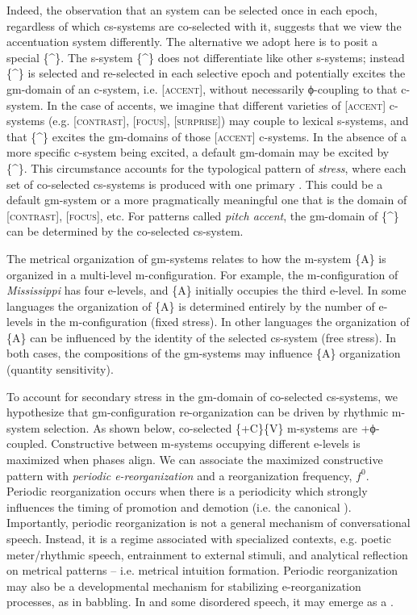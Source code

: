   Indeed, the observation that an  system can be selected once in each epoch, regardless of which cs-systems are co-selected with it, suggests that we view the accentuation system differently. The alternative we adopt here is to posit a special  \{\^{}\}. The s-system \{\^{}\} does not differentiate like other s-systems; instead \{\^{}\} is selected and re-selected in each selective epoch and potentially excites the gm-domain of an  c-system, i.e. [\textsc{accent}], without necessarily ϕ-coupling to that c-system. In the case of  accents, we imagine that different varieties of [\textsc{accent}] c-systems (e.g. [\textsc{contrast}], [\textsc{focus}], [\textsc{surprise}]) may couple to lexical s-systems, and that \{\^{}\} excites the gm-domains of those [\textsc{accent}] c-systems. In the absence of a more specific c-system being excited, a default gm-domain may be excited by \{\^{}\}. This circumstance accounts for the typological pattern of \textit{stress}, where each set of co-selected cs-systems is produced with one primary . This could be a default gm-sys\-tem or a more pragmatically meaningful one that is the domain of [\textsc{contrast}], [\textsc{focus}], etc. For patterns called \textit{pitch accent}, the gm-domain of \{\^{}\} can be determined by the co-selected cs-system.

  The metrical organization of  gm-sys\-tems relates to how the m-sys\-tem \{A\} is organized in a multi-level m-con\-fig\-u\-ra\-tion. For example, the m-con\-fig\-u\-ra\-tion of \textit{Mississippi} has four e-levels, and \{A\} initially occupies the third e-level. In some languages the organization of \{A\} is determined entirely by the number of e-levels in the m-con\-fig\-u\-ra\-tion (fixed stress). In other languages the organization of \{A\} can be influenced by the identity of the selected cs-system (free stress). In both cases, the compositions of the gm-sys\-tems may influence \{A\} organization (quantity sensitivity). 

  To account for secondary stress in the gm-domain of co-selected cs-systems, we hypothesize that gm-con\-fig\-u\-ra\-tion re-organization can be driven by rhythmic m-sys\-tem selection. As shown below, co-selected \{+C\}\{V\} m-sys\-tems are +ϕ-coupled. Constructive  between m-sys\-tems occupying different e-levels is maximized when  phases align. We can associate the maximized constructive  pattern with \textit{periodic e-reorganization} and a reorganization frequency, $f^0$. Periodic reorganization occurs when there is a periodicity which strongly influences the timing of promotion and demotion (i.e. the canonical ). Importantly, periodic reorganization is not a general mechanism of conversational speech. Instead, it is a regime associated with specialized contexts, e.g. poetic meter/rhythmic speech, entrainment to external stimuli, and analytical reflection on metrical patterns -- i.e. metrical intuition formation. Periodic reorganization may also be a developmental mechanism for stabilizing e-reorganization processes, as in babbling. In  and some disordered speech, it may emerge as a .

